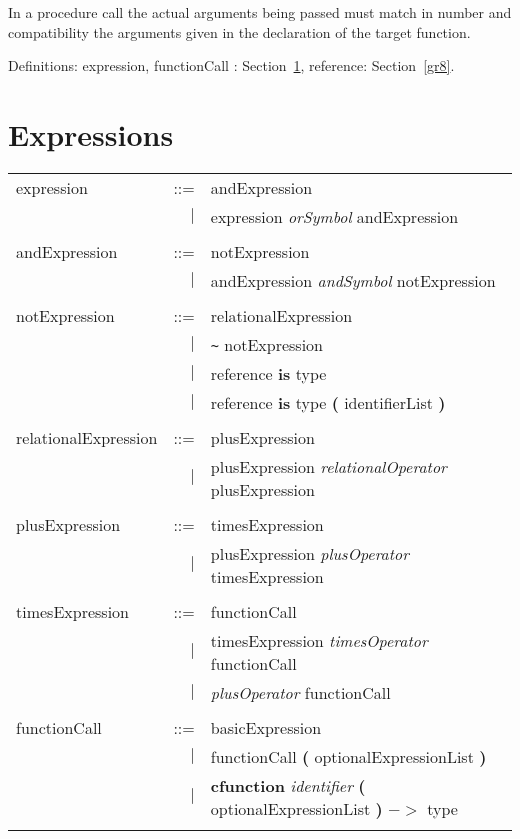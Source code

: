 In a procedure call the actual arguments being passed must match in number and
compatibility the arguments given in the declaration of the target function.

Definitions:
expression, functionCall : Section~\ref{gr7},
reference: Section~\ref{gr8}.

\section{Expressions}\label{gr7}

\begin{tabular}{l r l}
expression & ::= & andExpression \\
& $\mid$ & expression {\em orSymbol} andExpression \\ \\
andExpression & ::= & notExpression \\
& $\mid$ & andExpression {\em andSymbol} notExpression \\ \\
notExpression & ::= & relationalExpression \\
& $\mid$ & \verb+~+ notExpression \\
& $\mid$ & reference {\bf is} type \\
& $\mid$ & reference {\bf is} type {\bf (} identifierList {\bf )} \\ \\
relationalExpression & ::= & plusExpression \\
& $\mid$ & plusExpression {\em relationalOperator} plusExpression \\ \\
plusExpression & ::= & timesExpression \\
& $\mid$ & plusExpression {\em plusOperator} timesExpression \\ \\
timesExpression & ::= & functionCall \\
& $\mid$ & timesExpression {\em timesOperator} functionCall \\
& $\mid$ & {\em plusOperator} functionCall \\ \\
functionCall & ::= & basicExpression \\
& $\mid$ & functionCall {\bf (} optionalExpressionList {\bf )} \\
& $\mid$ & {\bf cfunction} {\em identifier} {\bf (} optionalExpressionList {\bf )} $->$ type \\ \\
\end{tabular}

